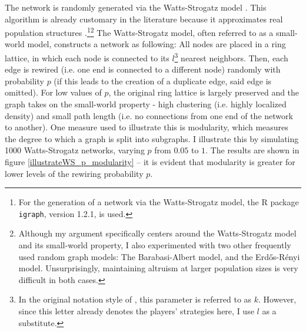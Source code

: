 \documentclass[12pt]{article}
\begin{document}
The network is randomly generated via the Watts-Strogatz model \citep{Watts1998}. This algorithm is already customary in the literature because it approximates real population structures \citep{Santos2008,Peleteiro2014}.\footnote{For the generation of a network via the Watts-Strogatz model, the R package \texttt{igraph}, version 1.2.1, is used.}\footnote{Although my argument specifically centers around the Watts-Strogatz model and its small-world property, I also experimented with two other frequently used random graph models: The Barabasi-Albert model, and the Erd\H{o}s-R\'{e}nyi model. Unsurprisingly, maintaining altruism at larger population sizes is very difficult in both cases.} The Watts-Strogatz model, often referred to as a small-world model, constructs a network as following: All nodes are placed in a ring lattice, in which each node is connected to its $l$\footnote{In the original notation style of \cite{Watts1998}, this parameter is referred to as $k$. However, since this letter already denotes the players' strategies here, I use $l$ as a substitute.} nearest neighbors. Then, each edge is rewired (i.e. one end is connected to a different node) randomly with probability $p$ (if this leads to the creation of a duplicate edge, said edge is omitted). For low values of $p$, the original ring lattice is largely preserved and the graph takes on the small-world property - high clustering (i.e. highly localized density) and small path length (i.e. no connections from one end of the network to another). One measure used to illustrate this is modularity, which measures the degree to which a graph is split into subgraphs. I illustrate this by simulating 1000 Watts-Strogatz networks, varying $p$ from $0.05$ to $1$. The results are shown in figure \ref{illustrateWS_p_modularity} -- it is evident that modularity is greater for lower levels of the rewiring probability $p$.
\end{document}
